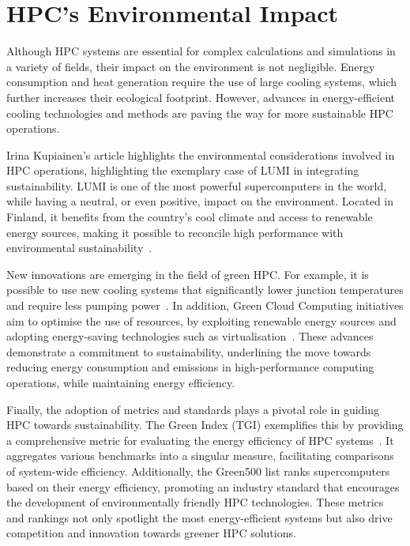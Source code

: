 \documentclass[12pt,oneside]{book} %
\begin{document}
\newpage
\section{HPC's Environmental Impact}
Although HPC systems are essential for complex calculations and simulations in
a variety of fields, their impact on the environment is not negligible. Energy
consumption and heat generation require the use of large cooling systems, which
further increases their ecological footprint. However, advances in
energy-efficient cooling technologies and methods are paving the way for more
sustainable HPC operations.

Irina Kupiainen's article highlights the environmental considerations involved
in HPC operations, highlighting the exemplary case of LUMI in integrating
sustainability. LUMI is one of the most powerful supercomputers in the world,
while having a neutral, or even positive, impact on the environment. Located in
Finland, it benefits from the country's cool climate and access to renewable
energy sources, making it possible to reconcile high performance with
environmental sustainability~\cite{Kupiainen2021HPCGreenDigital}.

New innovations are emerging in the field of green HPC. For example, it is
possible to use new cooling systems that significantly lower junction
temperatures and require less pumping power~\cite{9190269}. In addition, Green
Cloud Computing initiatives aim to optimise the use of resources, by exploiting
renewable energy sources and adopting energy-saving technologies such as
virtualisation~\cite{9917654,7912681}. These advances demonstrate a commitment
to sustainability, underlining the move towards reducing energy consumption and
emissions in high-performance computing operations, while maintaining energy
efficiency.

Finally, the adoption of metrics and standards plays a pivotal role in guiding
HPC towards sustainability. The Green Index (TGI) exemplifies this by providing
a comprehensive metric for evaluating the energy efficiency of HPC
systems~\cite{6270748}. It aggregates various benchmarks into a singular
measure, facilitating comparisons of system-wide efficiency. Additionally, the
Green500 list ranks supercomputers based on their energy efficiency, promoting
an industry standard that encourages the development of environmentally
friendly HPC technologies. These metrics and rankings not only spotlight the
most energy-efficient systems but also drive competition and innovation towards
greener HPC solutions.
\end{document}
